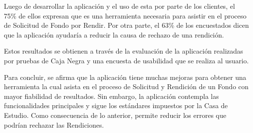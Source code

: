 \begin{resumen}

    Luego de desarrollar la aplicación y el uso de esta por parte de los clientes, el 75\% de ellos expresan que es una herramienta necesaria para asistir en el proceso de Solicitud de Fondo por Rendir. Por otra parte, el 63\% de los encuestados dicen que la aplicación ayudaría a reducir la causa de rechazo de una rendición.
    
    
    Estos resultados se obtienen a través de la evaluación de la aplicación realizadas por pruebas de Caja Negra y una encuesta de usabilidad que se realiza al usuario.
    
    

    
    Para concluir, se afirma que la aplicación tiene muchas mejoras para obtener una herramienta la cual asista en el proceso de Solicitud y Rendición de un Fondo con mayor fiabilidad de resultados. Sin embargo, la aplicación contempla las funcionalidades principales y sigue los estándares impuestos por la Casa de Estudio. Como consecuencia de lo anterior, permite reducir los errores que podrían rechazar las Rendiciones.



\end{resumen}